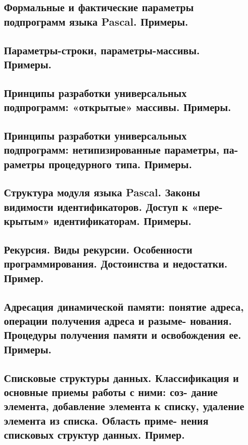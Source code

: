 \subsection{Формальные и фактические параметры подпрограмм языка Pascal. Примеры. }



\subsection{Параметры-строки, параметры-массивы. Примеры. }



\subsection{Принципы разработки универсальных подпрограмм: «открытые» массивы. Примеры. }



\subsection{Принципы разработки универсальных подпрограмм:  нетипизированные параметры, па-
раметры процедурного типа. Примеры. }



\subsection{Структура модуля языка Pascal. Законы видимости идентификаторов. Доступ к «пере-
крытым» идентификаторам. Примеры. }



\subsection{Рекурсия.  Виды  рекурсии.  Особенности  программирования. Достоинства  и  недостатки. 
Пример. }



\subsection{Адресация динамической памяти: понятие адреса, операции получения адреса и разыме-
нования. Процедуры получения памяти и освобождения ее. Примеры. }



\subsection{Списковые  структуры  данных.  Классификация  и  основные  приемы  работы  с  ними:  соз-
дание элемента, добавление элемента к списку, удаление элемента из списка. Область приме-
нения списковых структур данных. Пример. }



